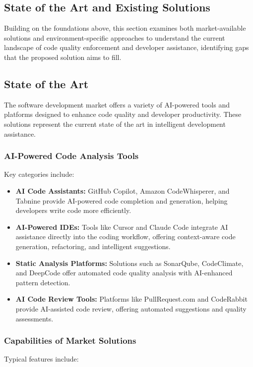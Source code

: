 \begin{spacing}{1.2}
\section{State of the Art and Existing Solutions}

Building on the foundations above, this section examines both market-available solutions and environment-specific approaches to understand the current landscape of code quality enforcement and developer assistance, identifying gaps that the proposed solution aims to fill.

\subsection{State of the Art}

The software development market offers a variety of AI-powered tools and platforms designed to enhance code quality and developer productivity. These solutions represent the current state of the art in intelligent development assistance.

\subsubsection{AI-Powered Code Analysis Tools}
Key categories include:

\begin{itemize}
\item \textbf{AI Code Assistants:} GitHub Copilot, Amazon CodeWhisperer, and Tabnine provide AI-powered code completion and generation, helping developers write code more efficiently.
\item \textbf{AI-Powered IDEs:} Tools like Cursor and Claude Code integrate AI assistance directly into the coding workflow, offering context-aware code generation, refactoring, and intelligent suggestions.
\item \textbf{Static Analysis Platforms:} Solutions such as SonarQube, CodeClimate, and DeepCode offer automated code quality analysis with AI-enhanced pattern detection.
\item \textbf{AI Code Review Tools:} Platforms like PullRequest.com and CodeRabbit provide AI-assisted code review, offering automated suggestions and quality assessments.
\end{itemize}

\subsubsection{Capabilities of Market Solutions}
Typical features include:


\end{spacing}
